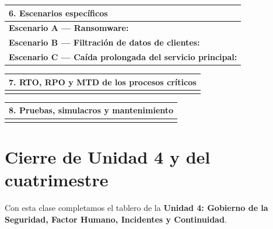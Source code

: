 \documentclass[12pt,a4paper]{article}
\begin{document}
\vspace{6pt}
\begin{tabularx}{\textwidth}{|X|}
\hline
\rowcolor{azulContinuidad!15}
\textbf{6. Escenarios espec\'ificos} \\[2pt]
\hline
\textbf{Escenario A --- Ransomware:} \hrulefill \\[6pt]
\textbf{Escenario B --- Filtraci\'on de datos de clientes:} \hrulefill \\[6pt]
\textbf{Escenario C --- Ca\'ida prolongada del servicio principal:} \hrulefill \\[2cm]
\hline
\end{tabularx}

\vspace{6pt}
\begin{tabularx}{\textwidth}{|X|}
\hline
\rowcolor{azulContinuidad!15}
\textbf{7. RTO, RPO y MTD de los procesos cr\'iticos} \\[2pt]
\hline
\\[2cm]
\hline
\end{tabularx}

\vspace{6pt}
\begin{tabularx}{\textwidth}{|X|}
\hline
\rowcolor{azulContinuidad!15}
\textbf{8. Pruebas, simulacros y mantenimiento} \\[2pt]
\hline
\\[1.5cm]
\hline
\end{tabularx}

\newpage
\section{Cierre de Unidad 4 y del cuatrimestre}

Con esta clase completamos el tablero de la \textbf{Unidad 4: Gobierno de la Seguridad, Factor Humano, Incidentes y Continuidad}.
\end{document}
